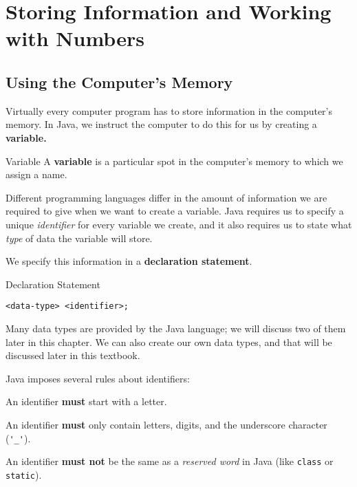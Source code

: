 
\chapter{Storing Information and Working with Numbers}
\label{chapter:info-numbers}

\minitoc

\section{Using the Computer's Memory}
\label{sec:using-memory}

Virtually every computer program has to store information in the computer's memory.  In Java, we instruct the computer to do this for us by creating a \textbf{variable.}

\begin{defn}{Variable}
A \textbf{variable} is a particular spot in the computer's memory to which we assign a name.
\end{defn}

Different programming languages differ in the amount of information we are required to give when we want to create a variable.  Java requires us to specify a unique \textit{identifier} for every variable we create, and it also requires us to state what \textit{type} of data the variable will store.

We specify this information in a \textbf{declaration statement}.

\begin{javaformat}{Declaration Statement}
\begin{verbatim}
<data-type> <identifier>;
\end{verbatim}
\end{javaformat}

Many data types are provided by the Java language; we will discuss two of them later in this chapter.  We can also create our own data types, and that will be discussed later in this textbook.

Java imposes several rules about identifiers:
\bi
\item An identifier \textbf{must} start with a letter.
\item An identifier \textbf{must} only contain letters, digits, and the underscore character (\lstinline{'_'}).
\item An identifier \textbf{must not} be the same as a \textit{reserved word} in Java (like \lstinline{class} or \lstinline{static}).
\ei

